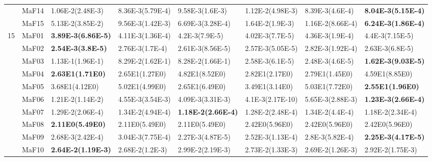 \documentclass[]{article}
\begin{document}
\begin{landscape}
\begin{table}
\begin{footnotesize}
\begin{tabular}{|l|l|l|l|l|l|l|l|}
 & MaF14 & 1.06E-2(2.48E-3) & \cellcolor{gray95} 8.36E-3(5.79E-4) & 9.58E-3(1.6E-3) & 1.12E-2(4.98E-3) & \cellcolor{gray95} 8.39E-3(4.6E-4) & \cellcolor{gray95} {\bf 8.04E-3(5.15E-4)}\\
 & MaF15 & 5.13E-2(3.85E-2) & 9.56E-3(1.42E-3) & \cellcolor{gray95} 6.69E-3(3.28E-4) & 1.64E-2(1.9E-3) & 1.16E-2(8.66E-4) & \cellcolor{gray95} {\bf 6.24E-3(1.86E-4)}\\
\hline

\multirow{15}{*}{15} & MaF01 & \cellcolor{gray95} {\bf 3.89E-3(6.86E-5)} & 4.11E-3(1.36E-4) & 4.2E-3(7.9E-5) & \cellcolor{gray95} 4.02E-3(7.7E-5) & 4.36E-3(1.9E-4) & 4.4E-3(7.15E-5)\\
 & MaF02 & \cellcolor{gray95} {\bf 2.54E-3(3.8E-5)} & 2.76E-3(1.7E-4) & \cellcolor{gray95} 2.61E-3(8.56E-5) & \cellcolor{gray95} 2.57E-3(5.05E-5) & 2.82E-3(1.92E-4) & 2.63E-3(6.8E-5)\\
 & MaF03 & 1.13E-1(1.96E-1) & 8.29E-2(1.62E-1) & \cellcolor{gray95} 8.28E-2(1.66E-1) & 2.58E-3(6.1E-5) & 2.48E-3(4.6E-5) & \cellcolor{gray95} {\bf 1.62E-3(9.03E-5)}\\
 & MaF04 & \cellcolor{gray95} {\bf 2.63E1(1.71E0)} & \cellcolor{gray95} 2.65E1(1.27E0) & 4.82E1(8.52E0) & \cellcolor{gray95} 2.82E1(2.17E0) & \cellcolor{gray95} 2.79E1(1.45E0) & 4.59E1(8.85E0)\\
 & MaF05 & 3.68E1(4.12E0) & 5.02E1(4.99E0) & \cellcolor{gray95} 2.65E1(6.49E0) & 3.49E1(3.14E0) & 5.03E1(7.72E0) & \cellcolor{gray95} {\bf 2.55E1(1.96E0)}\\
 & MaF06 & 1.21E-2(1.14E-2) & 4.55E-3(3.54E-3) & 4.09E-3(3.31E-3) & 4.1E-3(2.17E-10) & 5.65E-3(2.88E-3) & \cellcolor{gray95} {\bf 1.23E-3(2.66E-4)}\\
 & MaF07 & 1.29E-2(2.06E-4) & 1.34E-2(4.94E-4) & \cellcolor{gray95} {\bf 1.18E-2(2.66E-4)} & 1.28E-2(2.48E-4) & 1.34E-2(4.4E-4) & \cellcolor{gray95} 1.18E-2(2.34E-4)\\
 & MaF08 & \cellcolor{gray95} {\bf 2.11E0(5.49E0)} & 2.11E0(5.49E0) & \cellcolor{gray95} 2.11E0(5.49E0) & \cellcolor{gray95} 2.42E0(5.96E0) & 2.42E0(5.96E0) & \cellcolor{gray95} 2.42E0(5.96E0)\\
 & MaF09 & 2.68E-3(2.42E-4) & 3.04E-3(7.75E-4) & \cellcolor{gray95} 2.27E-3(4.87E-5) & 2.52E-3(1.13E-4) & 2.8E-3(5.82E-4) & \cellcolor{gray95} {\bf 2.25E-3(4.17E-5)}\\
 & MaF10 & \cellcolor{gray95} {\bf 2.64E-2(1.19E-3)} & \cellcolor{gray95} 2.68E-2(1.2E-3) & 2.99E-2(2.19E-3) & \cellcolor{gray95} 2.73E-2(1.33E-3) & \cellcolor{gray95} 2.69E-2(1.26E-3) & 2.92E-2(1.75E-3)\\

\end{tabular}
\end{footnotesize}
\end{table}
\end{landscape}
\end{document}
